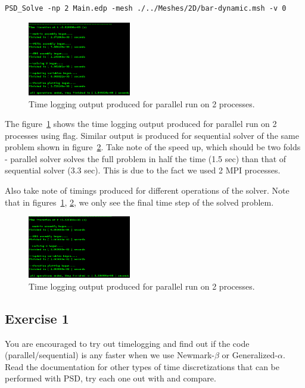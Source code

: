 {{\begin{lstlisting}[style=BashInputStyle]
	PSD_Solve -np 2 Main.edp -mesh ./../Meshes/2D/bar-dynamic.msh -v 0
\end{lstlisting}


\begin{figure}[h!]
	\centering
	\includegraphics[width=0.4\textwidth]{./Images/ed-time-par.png}
	\caption{Time logging output produced for parallel run on 2 processes.\label{time-par-ed}}
\end{figure}

The figure~\ref{time-par-ed} shows the time logging output produced for parallel run on 2 processes using  flag. Similar output is produced for sequential solver of the same problem shown in figure~\ref{time-seq-ed}. Take note of the speed up, which should be two folds - parallel solver solves the full problem in half the time (1.5 sec) than that of sequential solver (3.3 sec). This is due to the fact we used 2 MPI processes.

Also take note of timings produced for different operations of the solver. Note that in figures~\ref{time-par-ed}, \ref{time-seq-ed}, we only see the final time step of the solved problem. 

\begin{figure}[h!]
	\centering
	\includegraphics[width=0.4\textwidth]{./Images/ed-time-seq.png}
	\caption{Time logging output produced for parallel run on 2 processes.\label{time-seq-ed}}
\end{figure}

\subsection{Exercise 1}

You are encouraged to try out timelogging and find out if the code (parallel/sequential) is any faster when we use Newmark-$\beta$ or Generalized-$\alpha$. Read the documentation for other types of time discretizations that can be performed with PSD, try each one out with  and compare. 

}}
